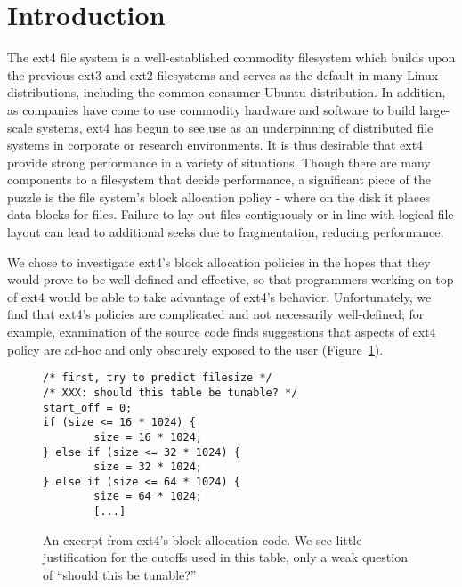 \documentclass{acm_proc_article-sp}
\begin{document}

\section{Introduction}
The ext4 file system is a well-established 
commodity filesystem which builds upon the 
previous ext3 and ext2 filesystems and serves 
as the default in many Linux distributions, 
including the common consumer Ubuntu distribution.
In addition, as companies have come to use 
commodity hardware and software to build 
large-scale systems, ext4 has begun to see 
use as an underpinning of distributed file 
systems in corporate or research environments.
It is thus desirable that ext4 provide strong 
performance in a variety of situations.  Though 
there are many components to a filesystem that 
decide performance, a significant piece of the 
puzzle is the file system's block allocation 
policy - where on the disk it places data blocks
for files.  Failure to lay out files
contiguously or in line with logical file layout 
can lead to additional seeks due to fragmentation, 
reducing performance.
 
We chose to investigate ext4's block allocation policies in the hopes that they would prove to be well-defined and effective, so that programmers working on top of ext4 would be able to take advantage of ext4's behavior.  Unfortunately, we find that ext4's policies are complicated and not necessarily well-defined; for example, examination of the source code finds suggestions that aspects of ext4 policy are ad-hoc and only obscurely exposed to the user (Figure~\ref{fig:code01}).
 


\begin{figure}[ht]
\begin{lstlisting}[frame=single]
/* first, try to predict filesize */
/* XXX: should this table be tunable? */
start_off = 0;
if (size <= 16 * 1024) {
        size = 16 * 1024;
} else if (size <= 32 * 1024) {
        size = 32 * 1024;
} else if (size <= 64 * 1024) {
        size = 64 * 1024;
        [...] \end{lstlisting}  
\caption{An excerpt from ext4's block allocation code.  We see little justification for the cutoffs used in this table, only a weak question of ``should this be tunable?''}
\label{fig:code01}
\end{figure} 
  
\end{document}

